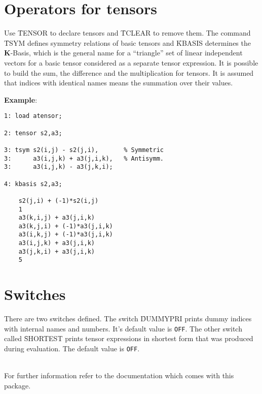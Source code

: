 \section{Operators for tensors}
Use \f{TENSOR} to declare tensors and \f{TCLEAR}
to remove them. The command \f{TSYM} defines symmetry relations of basic
tensors and \f{KBASIS} determines the
{\bf K}-Basis, which is the general name for a ``triangle'' set of linear independent
vectors for a basic tensor considered as a separate tensor expression.
It is possible to build the sum, the difference and the multiplication for tensors.
It is assumed that indices with identical names means the summation over their values. \par

{\bf Example}:
\begin{verbatim}
1: load atensor;

2: tensor s2,a3;

3: tsym s2(i,j) - s2(j,i),       % Symmetric
3:      a3(i,j,k) + a3(j,i,k),   % Antisymm.
3:      a3(i,j,k) - a3(j,k,i);

4: kbasis s2,a3;

	s2(j,i) + (-1)*s2(i,j)
	1
	a3(k,i,j) + a3(j,i,k)
	a3(k,j,i) + (-1)*a3(j,i,k)
	a3(i,k,j) + (-1)*a3(j,i,k)
	a3(i,j,k) + a3(j,i,k)
	a3(j,k,i) + a3(j,i,k)
	5
\end{verbatim}

\section{Switches}
There are two switches defined. The switch \f{DUMMYPRI} prints dummy
indices with internal names and numbers. It's default value is {\tt OFF}.
The other switch called \f{SHORTEST} prints tensor expressions in shortest
form that was produced during evaluation. The default value is {\tt OFF}. \par
\ \\
For further information refer to the documentation which comes with this package.

